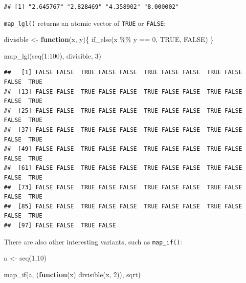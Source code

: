 \documentclass[
]{article}
\newenvironment{Shaded}{\begin{snugshade}}{\end{snugshade}}
\newcommand{\ConstantTok}[1]{\textcolor[rgb]{0.00,0.00,0.00}{#1}}
\newcommand{\ControlFlowTok}[1]{\textcolor[rgb]{0.13,0.29,0.53}{\textbf{#1}}}
\newcommand{\DecValTok}[1]{\textcolor[rgb]{0.00,0.00,0.81}{#1}}
\newcommand{\FunctionTok}[1]{\textcolor[rgb]{0.00,0.00,0.00}{#1}}
\newcommand{\NormalTok}[1]{#1}
\newcommand{\OtherTok}[1]{\textcolor[rgb]{0.56,0.35,0.01}{#1}}
\newcommand{\SpecialCharTok}[1]{\textcolor[rgb]{0.00,0.00,0.00}{#1}}
\begin{document}
\begin{verbatim}
## [1] "2.645767" "2.828469" "4.358902" "8.000002"
\end{verbatim}

\texttt{map\_lgl()} returns an atomic vector of \texttt{TRUE} or \texttt{FALSE}:

\begin{Shaded}
\begin{Highlighting}[]
\NormalTok{divisible }\OtherTok{\textless{}{-}} \ControlFlowTok{function}\NormalTok{(x, y)\{}
  \FunctionTok{if\_else}\NormalTok{(x }\SpecialCharTok{\%\%}\NormalTok{ y }\SpecialCharTok{==} \DecValTok{0}\NormalTok{, }\ConstantTok{TRUE}\NormalTok{, }\ConstantTok{FALSE}\NormalTok{)}
\NormalTok{\}}

\FunctionTok{map\_lgl}\NormalTok{(}\FunctionTok{seq}\NormalTok{(}\DecValTok{1}\SpecialCharTok{:}\DecValTok{100}\NormalTok{), divisible, }\DecValTok{3}\NormalTok{)}
\end{Highlighting}
\end{Shaded}

\begin{verbatim}
##   [1] FALSE FALSE  TRUE FALSE FALSE  TRUE FALSE FALSE  TRUE FALSE FALSE  TRUE
##  [13] FALSE FALSE  TRUE FALSE FALSE  TRUE FALSE FALSE  TRUE FALSE FALSE  TRUE
##  [25] FALSE FALSE  TRUE FALSE FALSE  TRUE FALSE FALSE  TRUE FALSE FALSE  TRUE
##  [37] FALSE FALSE  TRUE FALSE FALSE  TRUE FALSE FALSE  TRUE FALSE FALSE  TRUE
##  [49] FALSE FALSE  TRUE FALSE FALSE  TRUE FALSE FALSE  TRUE FALSE FALSE  TRUE
##  [61] FALSE FALSE  TRUE FALSE FALSE  TRUE FALSE FALSE  TRUE FALSE FALSE  TRUE
##  [73] FALSE FALSE  TRUE FALSE FALSE  TRUE FALSE FALSE  TRUE FALSE FALSE  TRUE
##  [85] FALSE FALSE  TRUE FALSE FALSE  TRUE FALSE FALSE  TRUE FALSE FALSE  TRUE
##  [97] FALSE FALSE  TRUE FALSE
\end{verbatim}

There are also other interesting variants, such as \texttt{map\_if()}:

\begin{Shaded}
\begin{Highlighting}[]
\NormalTok{a }\OtherTok{\textless{}{-}} \FunctionTok{seq}\NormalTok{(}\DecValTok{1}\NormalTok{,}\DecValTok{10}\NormalTok{)}

\FunctionTok{map\_if}\NormalTok{(a, (}\ControlFlowTok{function}\NormalTok{(x) }\FunctionTok{divisible}\NormalTok{(x, }\DecValTok{2}\NormalTok{)), sqrt)}
\end{Highlighting}
\end{Shaded}
\end{document}
